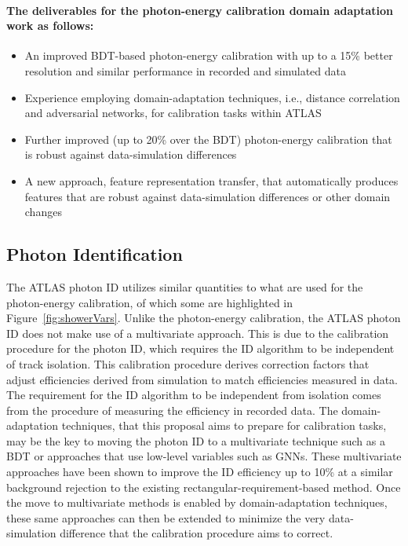 \documentclass[letter, USenglish, 11pt, subfigure]{article}
\begin{document}
\paragraph{The deliverables for the photon-energy calibration domain adaptation work as follows:}
\begin{itemize}
\item An improved BDT-based photon-energy calibration with up to a 15\% better resolution and similar performance in recorded and simulated data
\item Experience employing domain-adaptation techniques, i.e., distance correlation and adversarial networks, for calibration tasks within ATLAS
\item Further improved (up to 20\% over the BDT) photon-energy calibration that is robust against data-simulation differences
\item A new approach, feature representation transfer, that automatically produces features that are robust against data-simulation differences or other domain changes
\end{itemize}

\subsection{Photon Identification}

The ATLAS photon ID utilizes similar quantities to what are used for the photon-energy calibration, of which some are highlighted in Figure~\ref{fig:showerVars}. Unlike the photon-energy calibration, the ATLAS photon ID does not make use of a multivariate approach. This is due to the calibration procedure for the photon ID, which requires the ID algorithm to be independent of track isolation. This calibration procedure derives correction factors that adjust efficiencies derived from simulation to match efficiencies measured in data. The requirement for the ID algorithm to be independent from isolation comes from the procedure of measuring the efficiency in recorded data. The domain-adaptation techniques, that this proposal aims to prepare for calibration tasks, may be the key to moving the photon ID to a multivariate technique such as a BDT or approaches that use low-level variables such as GNNs. These multivariate approaches have been shown to improve the ID efficiency up to 10\% at a similar background rejection to the existing rectangular-requirement-based method. Once the move to multivariate methods is enabled by domain-adaptation techniques, these same approaches can then be extended to minimize the very data-simulation difference that the calibration procedure aims to correct.
\end{document}
